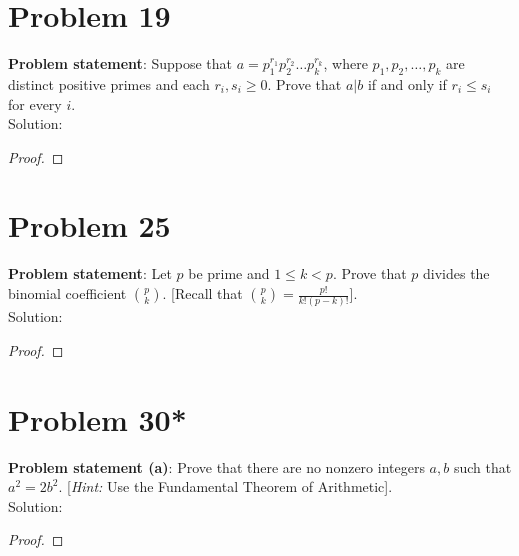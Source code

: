 \documentclass{article} %
\begin{document}
\newpage

\section*{Problem 19}


\textbf{Problem statement}: Suppose that $a = p_1^{r_1}p_2^{r_2} \ldots p_k^{r_k}$, where $p_1,p_2,\ldots,p_k$ are distinct positive primes and each $r_i,s_i \geq 0$.  Prove that $a|b$ if and only if $r_i \leq s_i$ for every $i$.
\\

Solution: 
\begin{addmargin}[1em]{0em}
\begin{proof}

\end{proof}
\end{addmargin}

\newpage

\section*{Problem 25}


\textbf{Problem statement}: Let $p$ be prime and $1 \leq k < p$.  Prove that $p$ divides the binomial coefficient $\binom{p}{k}$.  [Recall that $\binom{p}{k} = \frac{p!}{k!(p-k)!}$].
\\

Solution: 
\begin{addmargin}[1em]{0em}
\begin{proof}

\end{proof}
\end{addmargin}

\newpage

\section*{Problem 30*}


\textbf{Problem statement (a)}:  Prove that there are no nonzero integers $a,b$ such that $a^2 = 2b^2$.  [\textit{Hint:} Use the Fundamental Theorem of Arithmetic].
\\

Solution: 
\begin{addmargin}[1em]{0em}
\begin{proof}

\end{proof}
\end{addmargin}
\end{document}
